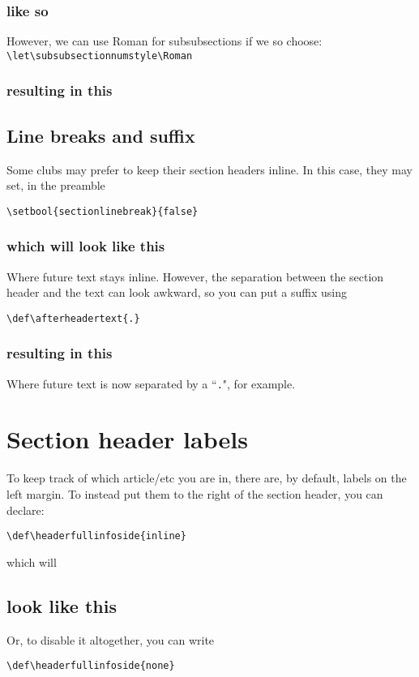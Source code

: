 \documentclass{constitution}
\begin{document}
\subsubsection{like so}
However, we can use Roman for subsubsections if we so choose:
\quad \verb|\let\subsubsectionnumstyle\Roman|\par
\let\subsubsectionnumstyle\Roman
\subsubsection{resulting in this}
\let\subsubsectionnumstyle\defaultnumstyle

\subsection{Line breaks and suffix}
Some clubs may prefer to keep their section headers inline.
In this case, they may set, in the preamble\par
\quad \verb|\setbool{sectionlinebreak}{false}|\par
{}
\subsubsection{which will look like this}
Where future text stays inline.
However, the separation between the section header and the text can look awkward, so you can put a suffix using\par
\quad \verb|\def\afterheadertext{.}|
\def\afterheadertext{.}
\subsubsection{resulting in this}
Where future text is now separated by a ``\verb|.|", for example.
\def\afterheadertext{}

\def\maxheaderfullinfosize{3}
\section{Section header labels}
To keep track of which article/etc you are in, there are, by default, labels on the left margin.
To instead put them to the right of the section header, you can declare:\par
\quad \verb|\def\headerfullinfoside{inline}|\par
which will
\def\headerfullinfoside{inline}
\subsection{look like this}
Or, to disable it altogether, you can write\par
\quad \verb|\def\headerfullinfoside{none}|\par
\def\headerfullinfoside{none}
\end{document}
